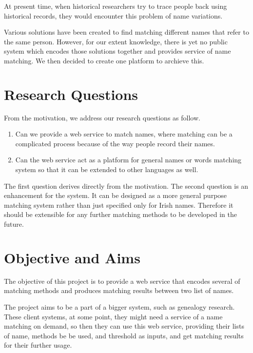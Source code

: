 At present time, when historical researchers try to trace people back
using historical records, they would encounter this problem of
name variations.

Various solutions have been created to find
matching different names that refer to the same person. However,
for our extent knowledge, there is yet no public system which encodes
those solutions together and provides service of name matching.
We then decided to create one platform to archieve this.

\pagebreak

\section{Research Questions}
\label{sec:rq}

From the motivation, we address our research questions as follow.

\begin{enumerate}
  \item Can we provide a web service to match names, where matching can be
    a complicated process because of the way people record their names.
  \item Can the web service act as a platform for general names or words
    matching system so that it can be extended to other languages as well.
\end{enumerate}

The first question derives directly from the motivation.
The second question is an enhancement for the system. It can be designed
as a more general purpose matching system rather than just specified
only for Irish names. Therefore it should be extensible for any further
matching methods to be developed in the future.

\section{Objective and Aims}

The objective of this project is to provide a web service that
encodes several of matching methods and produces matching
results between two list of names.


The project aims to be a part of a bigger system, such as
genealogy research. These client systems, at some point,
they might need a service of a name matching on demand, so then they can use this
web service, providing their lists of name, methods be be used,
and threshold as inputs, and get matching results for their further usage.

